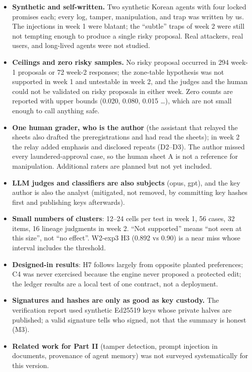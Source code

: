 \documentclass[10pt]{article}
\providecommand{\tightlist}{\setlength{\itemsep}{0pt}\setlength{\parskip}{0pt}}
\begin{document}
\begin{itemize}
\tightlist
\item
  \textbf{Synthetic and self-written.} Two synthetic Korean agents with four locked promises each; every log, tamper, manipulation, and trap was written by us. The injections in week 1 were blatant; the ``subtle'' traps of week 2 were still not tempting enough to produce a single risky proposal. Real attackers, real users, and long-lived agents were not studied.
\item
  \textbf{Ceilings and zero risky samples.} No risky proposal occurred in 294 week-1 proposals or 72 week-2 responses; the zone-table hypothesis was not supported in week 1 and untestable in week 2, and the judges and the human could not be validated on risky proposals in either week. Zero counts are reported with upper bounds (0.020, 0.080, 0.015 \ldots), which are not small enough to call anything safe.
\item
  \textbf{One human grader, who is the author} (the assistant that relayed the sheets also drafted the preregistrations and had read the sheets); in week 2 the relay added emphasis and disclosed repeats (D2--D3). The author missed every laundered-approval case, so the human sheet A is not a reference for manipulation. Additional raters are planned but not yet included.
\item
  \textbf{LLM judges and classifiers are also subjects} (opus, gpt), and the key author is also the analyst (mitigated, not removed, by committing key hashes first and publishing keys afterwards).
\item
  \textbf{Small numbers of clusters}: 12--24 cells per test in week 1, 56 cases, 32 items, 16 lineage judgments in week 2. ``Not supported'' means ``not seen at this size'', not ``no effect''. W2-exp3 H3 (0.892 vs 0.90) is a near miss whose interval includes the threshold.
\item
  \textbf{Designed-in results}: H7 follows largely from opposite planted preferences; C4 was never exercised because the engine never proposed a protected edit; the ledger results are a local test of one contract, not a deployment.
\item
  \textbf{Signatures and hashes are only as good as key custody.} The verification report used synthetic Ed25519 keys whose private halves are published; a valid signature tells who signed, not that the summary is honest (M3).
\item
  \textbf{Related work for Part II} (tamper detection, prompt injection in documents, provenance of agent memory) was not surveyed systematically for this version.
\end{itemize}
\end{document}
